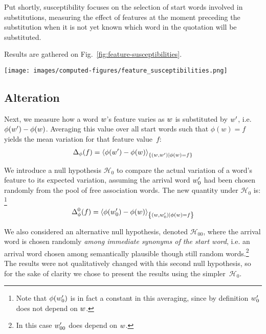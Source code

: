 Put shortly, susceptibility focuses on the selection of start words involved in substitutions, measuring the effect of features at the moment preceding the substitution when it is not yet known which word in the quotation will be substituted.

\medskip
Results are gathered on Fig.~\ref{fig:feature-susceptibilities}.


\begin{figure*}[!th]
    \centering
    \texttt{[image: images/computed-figures/feature\_susceptibilities.png]}
    \caption{\textbf{Substitution susceptibility:} average susceptibility to substitution vs. average feature value of a candidate word for substitution, with 95\% asymptotic confidence intervals.
    Each feature exhibits a specific and significant pattern favouring either high- or low-valued words for substitution.}
    \label{fig:feature-susceptibilities}
\end{figure*}

\subsection{Alteration}

Next, we measure how a word $w$'s feature varies as $w$ is substituted by $w'$, i.e. $\phi(w') - \phi(w)$.
Averaging this value over all start words such that $\phi(w) = f$ yields the mean variation for that feature value~$f$:
$$\Delta_{\phi}(f) = \left< \phi(w') - \phi(w) \right>_{\left\lbrace (w,w') | \phi(w) = f \right\rbrace}$$

We introduce a null hypothesis $\mathcal{H}_0$ to compare the actual variation of a word's feature to its expected variation, assuming the arrival word $w'_0$ had been chosen randomly from the pool of free association words.
The new quantity under $\mathcal{H}_0$ is:
\footnote{Note that $\phi(w'_0)$ is in fact a constant in this averaging, since by definition $w'_0$ does not depend on $w$.}
$$\Delta_{\phi}^0 (f) = \left< \phi({w'_0}) - \phi(w) \right>_{\left\lbrace (w,w'_0) | \phi(w) = f \right\rbrace}$$

We also considered an alternative null hypothesis, denoted $\mathcal{H}_{00}$, where the arrival word is chosen randomly \emph{among immediate synonyms of the start word}, i.e. an arrival word chosen among semantically plausible though still random words.\footnote{In this case $w'_{00}$ does depend on $w$.}
The results were not qualitatively changed with this second null hypothesis, so for the sake of clarity we chose to present the results using the simpler~$\mathcal{H}_0$.


